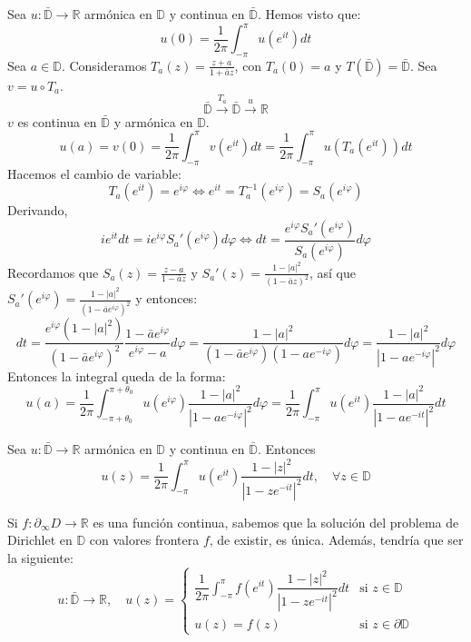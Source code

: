 Sea $u: \bar{\mathbb{D}} \to \mathbb{R}$ armónica en $\mathbb{D}$ y continua en $\bar{\mathbb{D}}$.
Hemos visto que:
$$u(0) = \frac{1}{2\pi} \int_{-\pi}^\pi u(e^{it})dt$$
Sea $a \in \mathbb{D}$.
Consideramos $T_a(z) = \frac{z+a}{1+\bar{a}z}$, con $T_a(0) = a$ y $T(\bar{\mathbb{D}}) = \bar{\mathbb{D}}$.
Sea $v = u \circ T_a$.
$$\bar{\mathbb{D}} \xrightarrow{T_a} \bar{\mathbb{D}} \xrightarrow{u} \mathbb{R}$$
$v$ es continua en $\bar{\mathbb{D}}$ y armónica en $\mathbb{D}$.
$$u(a) = v(0) = \frac{1}{2\pi} \int_{-\pi}^\pi v(e^{it})dt = \frac{1}{2\pi} \int_{-\pi}^\pi u(T_a(e^{it}))dt$$
Hacemos el cambio de variable:
$$T_a(e^{it}) = e^{i\varphi} \Leftrightarrow e^{it} = T_a^{-1}(e^{i\varphi}) = S_a(e^{i\varphi})$$
Derivando,
$$ie^{it}dt = ie^{i\varphi}S_a'(e^{i\varphi})d\varphi \Leftrightarrow dt = \frac{e^{i\varphi}S_a'(e^{i\varphi})}{S_a(e^{i\varphi})}d\varphi$$
Recordamos que $S_a(z) = \frac{z-a}{1-\bar{a}z}$ y $S_a'(z) = \frac{1-|a|^2}{(1-\bar{a}z)^2}$, así que $S_a'(e^{i\varphi}) = \frac{1-|a|^2}{(1-\bar{a}e^{i\varphi})^2}$ y entonces:
$$dt = \frac{e^{i\varphi}(1-|a|^2)}{(1-\bar{a}e^{i\varphi})^2}\frac{1-\bar{a}e^{i\varphi}}{e^{i\varphi}-a}d\varphi = \frac{1-|a|^2}{(1-\bar{a}e^{i\varphi})(1-ae^{-i\varphi})}d\varphi = \frac{1-|a|^2}{|1-ae^{-i\varphi}|^2}d\varphi$$
Entonces la integral queda de la forma:
$$u(a) = \frac{1}{2\pi} \int_{-\pi + \theta_0}^{\pi + \theta_0} u(e^{i\varphi})\frac{1-|a|^2}{|1-ae^{-i\varphi}|^2}d\varphi = \frac{1}{2\pi} \int_{-\pi}^\pi u(e^{it})\frac{1-|a|^2}{|1-ae^{-it}|^2}dt$$

\begin{theorem}
    Sea $u: \bar{\mathbb{D}} \to \mathbb{R}$ armónica en $\mathbb{D}$ y continua en $\bar{\mathbb{D}}$.
    Entonces
    $$u(z) = \frac{1}{2\pi} \int_{-\pi}^\pi u(e^{it})\frac{1-|z|^2}{|1-ze^{-it}|^2}dt, \quad \forall z \in \mathbb{D}$$
\end{theorem}

Si $f: \partial_\infty D \to \mathbb{R}$ es una función continua, sabemos que la solución del problema de Dirichlet en $\mathbb{D}$ con valores frontera $f$, de existir, es única.
Además, tendría que ser la siguiente:
$$u: \bar{\mathbb{D}} \to \mathbb{R}, \quad
    u(z) = \begin{cases}
        \dfrac{1}{2\pi} \int_{-\pi}^\pi f(e^{it})\dfrac{1-|z|^2}{|1-ze^{-it}|^2}dt & \text{si } z \in \mathbb{D}         \\
        u(z) = f(z)                                                                & \text{si } z \in \partial\mathbb{D}
    \end{cases}$$


